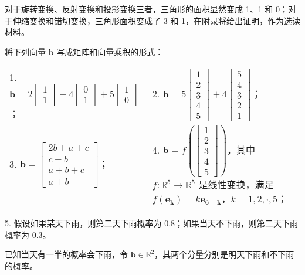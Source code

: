 	\begin{solution}
		对于旋转变换、反射变换和投影变换三者，三角形的面积显然变成 1、1 和 0；对于伸缩变换和错切变换，三角形面积变成了 3 和 1，在附录将给出证明，作为选读材料。
	\end{solution}
	
	\begin{exercise}[1.2.1]
		将下列向量 $\boldsymbol{b}$ 写成矩阵和向量乘积的形式：
		\begin{table}[htbp]
			\centering
			\begin{tabular}{p{0.45\textwidth}p{}}
				1. $\boldsymbol{b}=2\begin{bmatrix}
					1\\1
				\end{bmatrix}+4\begin{bmatrix}
					0\\1
				\end{bmatrix}+5\begin{bmatrix}
					1\\0
				\end{bmatrix}$； & 2. $\boldsymbol{b}=5\begin{bmatrix}
					1\\2\\3\\4\\5
				\end{bmatrix}+4\begin{bmatrix}
					5\\4\\3\\2\\1
				\end{bmatrix}$；\\
				3. $\boldsymbol{b}=\begin{bmatrix}
					2b+a+c\\c-b\\a+b+c\\a+b
				\end{bmatrix}$；&4. $\boldsymbol{b}=f\left(\begin{bmatrix}
					1\\2\\3\\4\\5
				\end{bmatrix}\right)$，其中 $f:\mathbb{R}^5\rightarrow\mathbb{R}^5$ 是线性变换，满足 $f(\boldsymbol{e_k})=k\boldsymbol{e_{6-k}}$，$k=1,2,\cdot,5$；
			\end{tabular}
		\end{table}
		
		5. 假设如果某天下雨，则第二天下雨概率为 0.8；如果当天不下雨，则第二天下雨概率为 0.3。
		
		已知当天有一半的概率会下雨，令 $\boldsymbol{b}\in\mathbb{R}^2$，其两个分量分别是明天下雨和不下雨的概率。
	\end{exercise}
	

